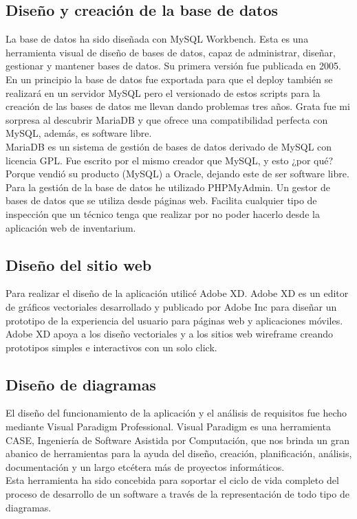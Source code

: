 \subsection{Diseño y creación de la base de datos}

La base de datos ha sido diseñada con MySQL Workbench. Esta es una herramienta visual de diseño de bases de datos, capaz de administrar, diseñar, gestionar y mantener bases de datos. Su primera versión fue publicada en 2005.
\\En un principio la base de datos fue exportada para que el deploy también se realizará en un servidor MySQL pero el versionado de estos scripts para la creación de las bases de datos me llevan dando problemas tres años. Grata fue mi sorpresa al descubrir MariaDB y que ofrece una compatibilidad perfecta con MySQL, además, es software libre.
\\MariaDB es un sistema de gestión de bases de datos derivado de MySQL con licencia GPL. Fue escrito por el mismo creador que MySQL, y esto ¿por qué? Porque vendió su producto (MySQL) a Oracle, dejando este de ser software libre.
\\Para la gestión de la base de datos he utilizado PHPMyAdmin. Un gestor de bases de datos que se utiliza desde páginas web. Facilita cualquier tipo de inspección que un técnico tenga que realizar por no poder hacerlo desde la aplicación web de inventarium.

\subsection{Diseño del sitio web}

Para realizar el diseño de la aplicación utilicé Adobe XD. Adobe XD es un editor de gráficos vectoriales desarrollado y publicado por Adobe Inc para diseñar un prototipo de la experiencia del usuario para páginas web y aplicaciones móviles.
\\Adobe XD apoya a los diseño vectoriales y a los sitios web wireframe creando prototipos simples e interactivos con un solo click.

\subsection{Diseño de diagramas}

El diseño del funcionamiento de la aplicación y el análisis de requisitos fue hecho mediante Visual Paradigm Professional. Visual Paradigm es una herramienta CASE, Ingeniería de Software Asistida por Computación, que nos brinda un gran abanico de herramientas para la ayuda del diseño, creación, planificación, análisis, documentación y un largo etcétera más de proyectos informáticos.
\\Esta herramienta ha sido concebida para soportar el ciclo de vida completo del proceso de desarrollo de un software a través de la representación de todo tipo de diagramas.


